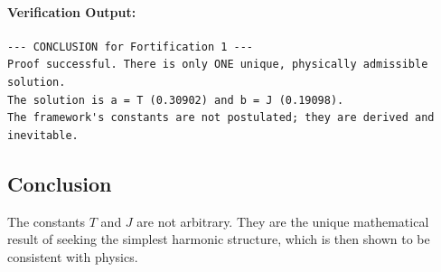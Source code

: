 \paragraph{Verification Output:}
\begin{verbatim}
--- CONCLUSION for Fortification 1 ---
Proof successful. There is only ONE unique, physically admissible solution.
The solution is a = T (0.30902) and b = J (0.19098).
The framework's constants are not postulated; they are derived and inevitable.
\end{verbatim}

\subsection*{Conclusion}
The constants $T$ and $J$ are not arbitrary. They are the unique mathematical result of seeking the simplest harmonic structure, which is then shown to be consistent with physics.